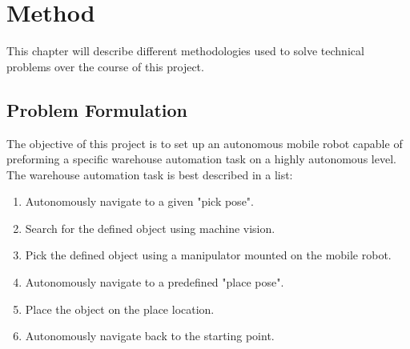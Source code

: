 \chapter{Method}

This chapter will describe different methodologies used to solve technical problems over the course of this project.

\section{Problem Formulation}
The objective of this project is to set up an autonomous mobile robot capable of preforming a specific warehouse automation task on a highly autonomous level. The warehouse automation task is best described in a list:

\begin{enumerate}
    \item Autonomously navigate to a given "pick pose".
    \item Search for the defined object using machine vision.
    \item Pick the defined object using a manipulator mounted on the mobile robot.
    \item Autonomously navigate to a predefined "place pose".
    \item Place the object on the place location.
    \item Autonomously navigate back to the starting point.
\end{enumerate}







